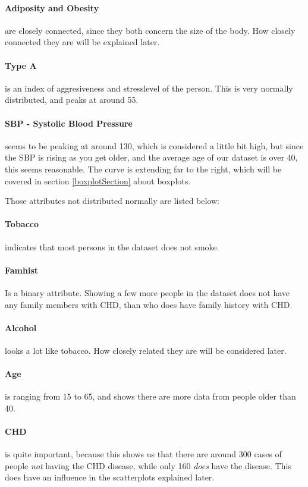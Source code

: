 \paragraph{Adiposity and Obesity} are closely connected, since they both concern the size of the body. How closely connected they are will be explained later.

\paragraph{Type A} is an index of aggresiveness and stresslevel of the person. This is very normally distributed, and peaks at around 55.

\paragraph{SBP - Systolic Blood Pressure} 	seems to be peaking at around 130, which is considered a little bit high, but since the SBP is rising as you get older, and the average age of our dataset is over 40, this seems reasonable. The curve is extending far to the right, which will be covered in section \ref{boxplotSection} about boxplots.

Those attributes not distributed normally are listed below:
\paragraph{Tobacco} indicates that most persons in the dataset does not smoke.
\paragraph{Famhist} Is a binary attribute. Showing a few more people in the dataset does not have any family members with CHD, than who does have family history with CHD.
\paragraph{Alcohol} looks a lot like tobacco. How closely related they are will be considered later.
\paragraph{Age} is ranging from 15 to 65, and shows there are more data from people older than 40.
\paragraph{CHD} is quite important, because this shows us that there are around 300 cases of people \textit{not} having the CHD disease, while only 160 \textit{does} have the disease. This does have an influence in the scatterplots explained later.

